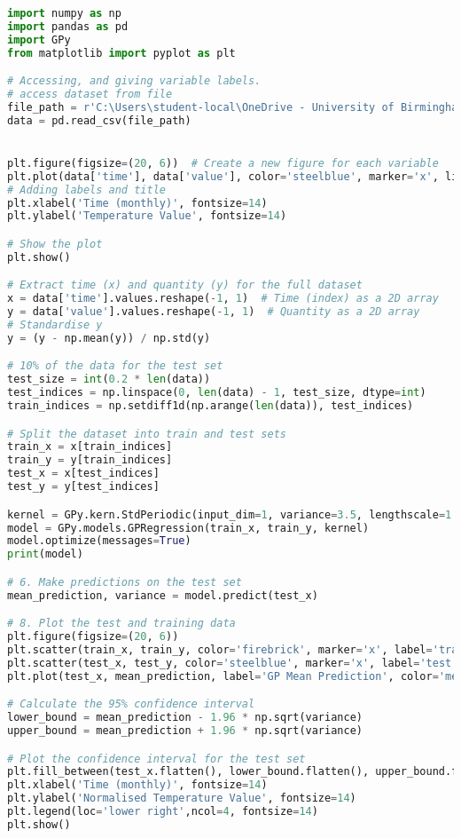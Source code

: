 \documentclass[12pt,a4paper]{article}
\begin{document}
\vspace{10pt}
\begin{lstlisting}[language=python, caption={Code of the Creation of Figures \ref{fig:Per dataset plot} and \ref{fig:Per GPregression}}]
import numpy as np
import pandas as pd
import GPy
from matplotlib import pyplot as plt

# Accessing, and giving variable labels.
# access dataset from file
file_path = r'C:\Users\student-local\OneDrive - University of Birmingham\Dissertation\nottem.csv'
data = pd.read_csv(file_path)


plt.figure(figsize=(20, 6))  # Create a new figure for each variable
plt.plot(data['time'], data['value'], color='steelblue', marker='x', linewidth=3, markersize=10)
# Adding labels and title
plt.xlabel('Time (monthly)', fontsize=14)
plt.ylabel('Temperature Value', fontsize=14)

# Show the plot
plt.show()

# Extract time (x) and quantity (y) for the full dataset
x = data['time'].values.reshape(-1, 1)  # Time (index) as a 2D array
y = data['value'].values.reshape(-1, 1)  # Quantity as a 2D array
# Standardise y
y = (y - np.mean(y)) / np.std(y)

# 10% of the data for the test set
test_size = int(0.2 * len(data))  
test_indices = np.linspace(0, len(data) - 1, test_size, dtype=int)
train_indices = np.setdiff1d(np.arange(len(data)), test_indices)

# Split the dataset into train and test sets
train_x = x[train_indices]  
train_y = y[train_indices]  
test_x = x[test_indices]    
test_y = y[test_indices]

kernel = GPy.kern.StdPeriodic(input_dim=1, variance=3.5, lengthscale=1.2, period=1)
model = GPy.models.GPRegression(train_x, train_y, kernel)
model.optimize(messages=True)
print(model)

# 6. Make predictions on the test set
mean_prediction, variance = model.predict(test_x)

# 8. Plot the test and training data
plt.figure(figsize=(20, 6))
plt.scatter(train_x, train_y, color='firebrick', marker='x', label='train', s=50)
plt.scatter(test_x, test_y, color='steelblue', marker='x', label='test', s=50)
plt.plot(test_x, mean_prediction, label='GP Mean Prediction', color='mediumpurple', linewidth=3)

# Calculate the 95% confidence interval
lower_bound = mean_prediction - 1.96 * np.sqrt(variance)
upper_bound = mean_prediction + 1.96 * np.sqrt(variance)

# Plot the confidence interval for the test set
plt.fill_between(test_x.flatten(), lower_bound.flatten(), upper_bound.flatten(), color='plum', alpha=0.3, label='Credible Interval (95%)')
plt.xlabel('Time (monthly)', fontsize=14)
plt.ylabel('Normalised Temperature Value', fontsize=14)
plt.legend(loc='lower right',ncol=4, fontsize=14)
plt.show()
\end{lstlisting}
\end{document}
